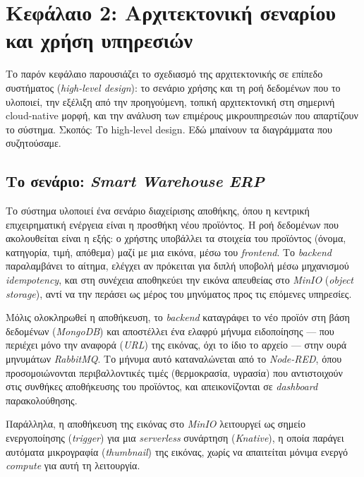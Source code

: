 
\newpage
\section{Κεφάλαιο 2: Αρχιτεκτονική σεναρίου και χρήση υπηρεσιών}

Το παρόν κεφάλαιο παρουσιάζει το σχεδιασμό της αρχιτεκτονικής σε επίπεδο συστήματος (\textit{high-level design}): το σενάριο χρήσης και τη ροή δεδομένων που το υλοποιεί, την εξέλιξη από την προηγούμενη, τοπική αρχιτεκτονική στη σημερινή cloud-native μορφή, και την ανάλυση των επιμέρους μικρουπηρεσιών που απαρτίζουν το σύστημα.
Σκοπός: Το high-level design. Εδώ μπαίνουν τα διαγράμματα που συζητούσαμε.


\subsection{Το σενάριο: \textit{Smart Warehouse ERP}}

Το σύστημα υλοποιεί ένα σενάριο διαχείρισης αποθήκης, όπου η κεντρική επιχειρηματική ενέργεια είναι η προσθήκη νέου προϊόντος. Η ροή δεδομένων που ακολουθείται είναι η εξής: ο χρήστης υποβάλλει τα στοιχεία του προϊόντος (όνομα, κατηγορία, τιμή, απόθεμα) μαζί με μια εικόνα, μέσω του \textit{frontend}. Το \textit{backend} παραλαμβάνει το αίτημα, ελέγχει αν πρόκειται για διπλή υποβολή μέσω μηχανισμού \textit{idempotency}, και στη συνέχεια αποθηκεύει την εικόνα απευθείας στο \textit{MinIO} (\textit{object storage}), αντί να την περάσει ως μέρος του μηνύματος προς τις επόμενες υπηρεσίες.

Μόλις ολοκληρωθεί η αποθήκευση, το \textit{backend} καταγράφει το νέο προϊόν στη βάση δεδομένων (\textit{MongoDB}) και αποστέλλει ένα ελαφρύ μήνυμα ειδοποίησης --- που περιέχει μόνο την αναφορά (\textit{URL}) της εικόνας, όχι το ίδιο το αρχείο --- στην ουρά μηνυμάτων \textit{RabbitMQ}. Το μήνυμα αυτό καταναλώνεται από το \textit{Node-RED}, όπου προσομοιώνονται περιβαλλοντικές τιμές (θερμοκρασία, υγρασία) που αντιστοιχούν στις συνθήκες αποθήκευσης του προϊόντος, και απεικονίζονται σε \textit{dashboard} παρακολούθησης.

Παράλληλα, η αποθήκευση της εικόνας στο \textit{MinIO} λειτουργεί ως σημείο ενεργοποίησης (\textit{trigger}) για μια \textit{serverless} συνάρτηση (\textit{Knative}), η οποία παράγει αυτόματα μικρογραφία (\textit{thumbnail}) της εικόνας, χωρίς να απαιτείται μόνιμα ενεργό \textit{compute} για αυτή τη λειτουργία.

